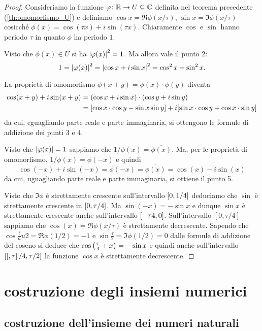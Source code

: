 \begin{proof}
Consideriamo la funzione $\varphi\colon {\mathbb R} \to U\subseteq {\mathbb C}$ 
definita nel teorema precedente (\ref{th:omomorfismo_U}) 
e definiamo $\cos x = \Re \phi(x/\tau)$, $\sin x = \Im \phi(x/\tau)$
cosicché $\phi(x) = \cos(\tau x) + i \sin (\tau x)$.
Chiaramente $\cos$ e $\sin$ hanno periodo $\tau$ in quanto 
$\phi$ ha periodo $1$.

Visto che $\phi(x)\in U$ si ha ${\left|\varphi(x)\right|}^2=1$.
Ma allora vale il punto 2:
\[
 1 = {\left|\varphi(x)\right|}^2 
 = {\left|\cos x + i\sin x\right|}^2 
 = \cos^2 x + \sin^2 x.
\]

La proprietà di omomorfismo 
$\phi(x+y)=\phi(x)\cdot \phi(y)$ diventa 
\begin{align*}
  \cos(x+y) + i \sin(x+y)
  &=(\cos x + i \sin x)\cdot(\cos y + i \sin y) \\
  &= 
  {\left[ \cos x\cdot \cos y - \sin x \sin y \right]}
  + i{\left[ \sin x\cdot \cos y + \cos x\cdot \sin y \right]}
\end{align*}
da cui, eguagliando parte reale e parte immaginaria, 
si ottengono le formule di addizione dei punti 3 e 4.

Visto che ${\left|\varphi(x)\right|}=1$ sappiamo che 
$1/\phi(x) = \overline{\phi(x)}$. 
Ma, per le proprietà di omomorfismo, $1/\phi(x)=\phi(-x)$ e quindi 
\[
\cos (-x) + i \sin(-x) 
= \phi(-x) 
= \overline{\phi(x)}
= \cos(x) - i \sin(x)
\]
da cui, uguagliando parte reale e parte immaginaria, 
si ottiene il punto 5.

Visto che $\Im \phi$ è strettamente crescente sull'intervallo $\left[0,1/4\right]$
deduciamo che $\sin$ è strettamente crescente in $\left[0,\tau/4\right]$.
Ma $\sin(-x) = -\sin x$ e dunque $\sin x$ è strettamente 
crescente anche sull'intervallo $\left[-\tau 4,0\right]$.
Sull'intervallo $[0,\tau/4]$ sappiamo che $\cos(x) = \Re \phi(x/\tau)$ 
è strettamente decrescente. 
Sapendo che $\cos \frac tau 2 = \Re \phi(1/2) = -1$ e 
$\sin\frac \tau 2 = \Im \phi(1/2)=0$ dalle formule di addizione 
del coseno si deduce che $\cos{\left( \frac \tau 4 + x \right)} = -\sin x$
e quindi anche sull'intervallo $\left[[,\tau\right]/4,\tau/2]$ 
la funzione $\cos x$ è strettamente decrescente.
\end{proof}

\section{costruzione degli insiemi numerici}

\subsection{costruzione dell'insieme dei numeri naturali}

